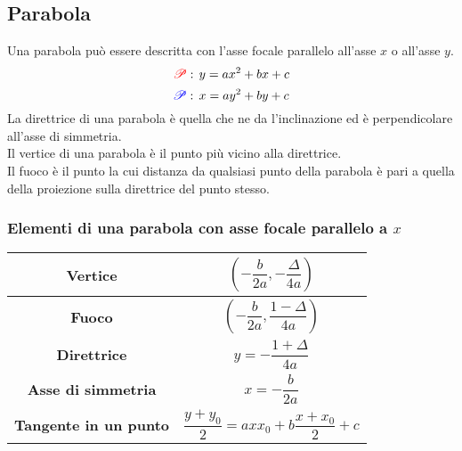 \subsection{Parabola}\label{subsec:geomanal:parabola}
\begin{center}
\end{center}
Una parabola può essere descritta con l'asse focale parallelo all'asse $x$ o all'asse $y$.
\begin{equation*}
\mathcolor{red}{\mathscr{P}}:\,y=ax^2+bx+c
\end{equation*}
\begin{equation*}
\mathcolor{blue}{\mathscr{P}}:\,x=ay^2+by+c
\end{equation*}
La direttrice di una parabola è quella che ne da l'inclinazione ed è perpendicolare all'asse di
simmetria.\\
Il vertice di una parabola è il punto più vicino alla direttrice.\\
Il fuoco è il punto la cui distanza da qualsiasi punto della parabola è pari a quella della proiezione
sulla direttrice del punto stesso.

\subsubsection{Elementi di una parabola con asse focale parallelo a $x$}
\begin{center}
	\begin{tabular}{c | c}
		\textbf{Vertice} & $\left(-\dfrac{b}{2a}, -\dfrac{\Delta}{4a}\right)$\\\hline
		\textbf{Fuoco} & $\left(-\dfrac{b}{2a},\dfrac{1-\Delta}{4a}\right)$\\\hline
		\textbf{Direttrice} & $y=-\dfrac{1+\Delta}{4a}$\\\hline
		\textbf{Asse di simmetria} & $x=-\dfrac{b}{2a}$\\\hline
		\textbf{Tangente in un punto} & $\dfrac{y+y_0}{2}=axx_0+b\dfrac{x+x_0}{2}+c$
	\end{tabular}
\end{center}


